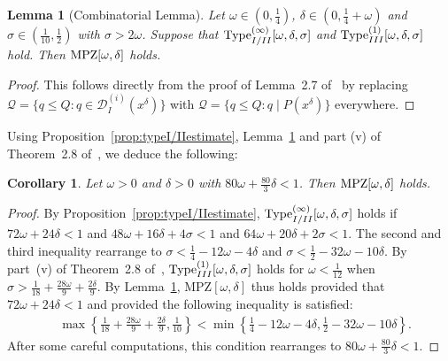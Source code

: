 \documentclass{amsart}
\newtheorem{cor}{Corollary}
\newtheorem{lemma}{Lemma}
\numberwithin{equation}{section}
\begin{document}
\begin{lemma}[Combinatorial Lemma]\label{lem:combinatoriallemma}
Let  $\omega \in (0,\frac{1}{4})$,  $\delta \in (0,\frac{1}{4}+\omega)$ and $\sigma \in (\frac{1}{10}, \frac{1}{2})$  with $\sigma > 2\omega$. Suppose that $\mbox{\rm Type}_{I/II}^{(\infty)}[\omega,\delta,\sigma]$ and  $\mbox{\rm Type}_{III}^{(1)}[\omega,\delta,\sigma]$ hold. Then $\mbox{\rm MPZ}[\omega,\delta]$ holds.
\end{lemma}

\begin{proof}
This follows directly from the proof of Lemma~2.7 of~\cite{Polymath:2014:EDZ} by replacing $\mathcal{Q} = \{q \leq Q: q \in \mathcal{D}_I^{(i)}(x^\delta)\}$ with $\mathcal{Q} = \{q \leq Q: q \mid P(x^\delta)\}$ everywhere.
\end{proof}

Using Proposition~\ref{prop:typeI/IIestimate}, Lemma~\ref{lem:combinatoriallemma} and part (v) of Theorem~2.8 of~\cite{Polymath:2014:EDZ}, we deduce the following:

\begin{cor}\label{cor:goodomegaanddelta}
Let $\omega>0$ and $ \delta >0$ with $80 \omega +\frac{80}{3} \delta  <  1$. Then $\mbox{\rm MPZ}[\omega,\delta]$ holds.
\end{cor}

\begin{proof}
By Proposition~\ref{prop:typeI/IIestimate}, $\mbox{\rm Type}_{I/II}^{(\infty)}[\omega,\delta,\sigma]$ holds if $72\omega +24\delta <1$ and $48 \omega +16\delta+4\sigma  < 1$ and $64\omega + 20\delta+2\sigma  <1$. The second and third inequality rearrange to  $\sigma < \frac{1}{4}-12 \omega -4 \delta $ and $\sigma <\frac{1}{2}-32\omega - 10\delta$. By part~(v) of Theorem~2.8 of~\cite{Polymath:2014:EDZ}, $\mbox{\rm Type}_{III}^{(1)}[\omega,\delta,\sigma]$ holds for $\omega < \frac{1}{12}$ when $\sigma > \frac{1}{18} + \frac{28 \omega}{9} + \frac{2 \delta}{9}$.   By Lemma~\ref{lem:combinatoriallemma}, $\mbox{MPZ}[\omega,\delta]$ thus holds provided that $72\omega +24\delta <1$ and provided the following  inequality is satisfied:
\begin{align*}
&\max\left\{\frac{1}{18} + \frac{28 \omega}{9} + \frac{2 \delta}{9}, \frac{1}{10}\right\} < \min\left\{ \frac{1}{4}-12 \omega -4\delta, \frac{1}{2}-32\omega - 10\delta \right\}.
\end{align*} 
 After some careful computations, this condition rearranges to  $80 \omega +\frac{80}{3}\delta <  1$. 
\end{proof}
\end{document}
